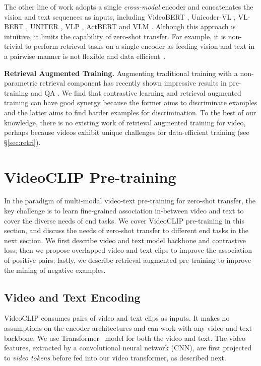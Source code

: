 \documentclass[11pt]{article}
\begin{document}
The other line of work adopts a single \textit{cross-modal} encoder and concatenates the vision and text sequences as inputs, including
VideoBERT \cite{sun2019videobert}, Unicoder-VL \cite{li2020unicoder}, VL-BERT \cite{Su2020VL-BERT:}, UNITER \cite{chen2020uniter}, VLP \cite{zhou2018end},
ActBERT \cite{zhu2020actbert} and VLM \cite{xu-etal-2021-vlm}.
Although this approach is intuitive, it limits the capability of zero-shot transfer. For example, it is non-trivial to perform retrieval tasks on a single encoder as feeding vision and text in a pairwise manner is not flexible and data efficient~\cite{luo2020univilm}.






\noindent\textbf{Retrieval Augmented Training.}
Augmenting traditional training with a non-parametric retrieval component has recently shown impressive results in pre-training
\cite{khandelwal2019generalization,guu2020realm,lewis2020pre}
and QA
\cite{izacard2020leveraging,karpukhin2020dense}. 
We find that contrastive learning and retrieval augmented training can have good synergy because the former aims to discriminate examples and the latter aims to find harder examples for discrimination. 
To the best of our knowledge, there is no existing work of retrieval augmented training for video, perhaps because videos exhibit unique challenges for data-efficient training (see \S\ref{sec:retri}).

\section{VideoCLIP Pre-training}
\label{sec:pretrain}

In the paradigm of multi-modal video-text pre-training for zero-shot transfer, the key challenge is to learn fine-grained association in-between video and text to cover the diverse needs of end tasks.
We cover VideoCLIP pre-training in this section, and discuss the needs of zero-shot transfer to different end tasks in the next section.
We first describe video and text model backbone and contrastive loss;
then we propose overlapped video and text clips to improve the association of positive pairs; lastly, we describe retrieval augmented pre-training to improve the mining of negative examples.

\subsection{Video and Text Encoding}
VideoCLIP consumes pairs of video and text clips  as inputs.
It makes no assumptions on the encoder architectures and can work with any video and text backbone.
We use Transformer~\cite{vaswani2017attention} model for both the video and text.
The video features, extracted by a convolutional neural network (CNN), are first projected to \textit{video tokens} before fed into our video transformer, as described next.
\end{document}
